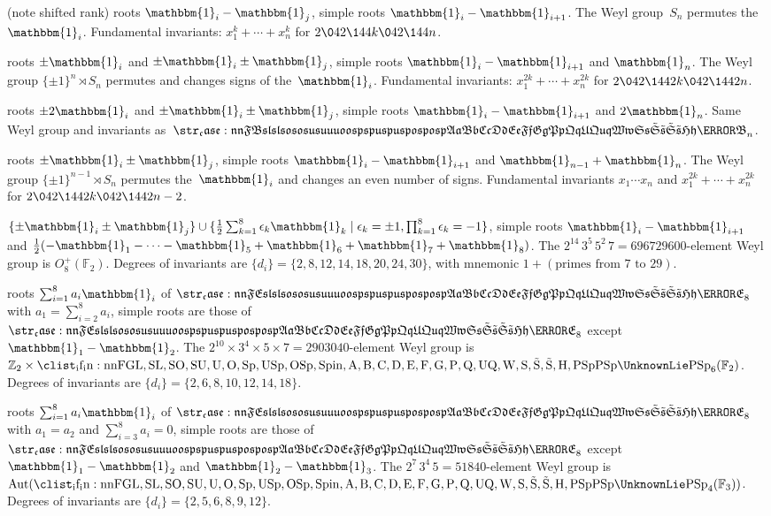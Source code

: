 \documentclass[10pt,letterpaper]{article}
\def\leq{\042\144}%
\newcommand{\ZZ}{\mathbb{Z}} %
\newcommand{\FF}{\mathbb{F}} %
\newcommand{\one}{\mathbbm{1}}
\newcommand{\Lie}[1]{
  \mathrm {
    \clist_if_in:nnF
      { GL , SL , SO , SU , U , O , Sp , USp , OSp , Spin , A , B , C , D , E , F , G , P , Q , UQ , W , S , \tilde S , \tilde{S} , H , PSp }
      {#1} { \UnknownLie }
    #1
  }
}
\newcommand{\lie}[1]{
  \mathfrak {
    \str_case:nnF {#1}
      {
        { sl } { sl }
        { so } { so }
        { su } { su }
        { u } { u }
        { o } { o }
        { sp } { sp }
        { usp } { usp }
        { osp } { osp }
        { A } { a }
        { B } { b }
        { C } { c }
        { D } { d }
        { E } { e }
        { F } { f }
        { G } { g }
        { P } { p }
        { Q } { q }
        { UQ } { uq }
        { W } { w }
        { S } { s }
        { \tilde S } { \tilde s }
        { \tilde{S} } { \tilde{s} }
        { H } { h }
      } { \ERROR #1 }
  }
}
\begin{document}
\begin{description}[topsep=0pt,parsep=0pt,partopsep=0pt,itemsep=0pt,leftmargin=1em]
\item[$\lie{A}_{n-1}$:] (note shifted rank) roots $\one_i-\one_j$, simple roots $\one_i-\one_{i+1}$.
The Weyl group~$S_n$ permutes the~$\one_i$.
Fundamental invariants: $x_1^k+\cdots+x_n^k$ for $2\leq k\leq n$.

\item[$\lie{B}_n$:] roots $\pm\one_i$ and $\pm\one_i\pm\one_j$, simple roots $\one_i-\one_{i+1}$ and $\one_n$.
The Weyl group $\{\pm 1\}^n\rtimes S_n$ permutes and changes signs of the~$\one_i$.
Fundamental invariants: $x_1^{2k}+\cdots+x_n^{2k}$ for $2\leq 2k\leq 2n$.

\item[$\lie{C}_n$:] roots $\pm2\one_i$ and $\pm\one_i\pm\one_j$, simple roots $\one_i-\one_{i+1}$ and $2\one_n$.
Same Weyl group and invariants as~$\lie{B}_n$.

\item[$\lie{D}_n$:] roots $\pm\one_i\pm\one_j$, simple roots $\one_i-\one_{i+1}$ and $\one_{n-1}+\one_n$.
The Weyl group $\{\pm 1\}^{n-1}\rtimes S_n$ permutes the~$\one_i$ and changes an even number of signs.
Fundamental invariants $x_1\cdots x_n$ and $x_1^{2k}+\cdots+x_n^{2k}$ for $2\leq 2k\leq 2n-2$.

\item[$\lie{E}_8$:] $\{\pm\one_i\pm\one_j\}\cup \{\frac{1}{2}\sum_{k=1}^8\epsilon_k\one_k\mid \epsilon_k=\pm 1, \prod_{k=1}^8\epsilon_k=-1\}$,
simple roots $\one_i-\one_{i+1}$ and $\frac{1}{2}(-\one_1-\cdots-\one_5+\one_6+\one_7+\one_8)$.
The $2^{14}\,3^5\,5^2\,7=696729600$-element Weyl group is $O_8^+(\FF_2)$.
Degrees of invariants are $\{d_i\}=\{2,8,12,14,18,20,24,30\}$, with mnemonic $1+(\text{primes from $7$ to $29$})$.

\item[$\lie{E}_7$:] roots $\sum_{i=1}^8 a_i \one_i$ of $\lie{E}_8$ with $a_1=\sum_{i=2}^8 a_i$,
simple roots are those of~$\lie{E}_8$ except $\one_1-\one_2$.
The $2^{10}\times 3^4\times 5\times 7=2903040$-element Weyl group is $\ZZ_2\times \Lie{PSp}_6(\FF_2)$.  Degrees of invariants are $\{d_i\}=\{2,6,8,10,12,14,18\}$.

\item[$\lie{E}_6$:] roots $\sum_{i=1}^8 a_i \one_i$ of $\lie{E}_8$ with $a_1=a_2$ and $\sum_{i=3}^8 a_i=0$,
simple roots are those of~$\lie{E}_8$ except $\one_1-\one_2$ and $\one_2-\one_3$.
The $2^7\,3^4\,5=51840$-element Weyl group is $\operatorname{Aut}(\Lie{PSp}_4(\FF_3))$.  Degrees of invariants are $\{d_i\}=\{2,5,6,8,9,12\}$.


\end{description}
\end{document}
